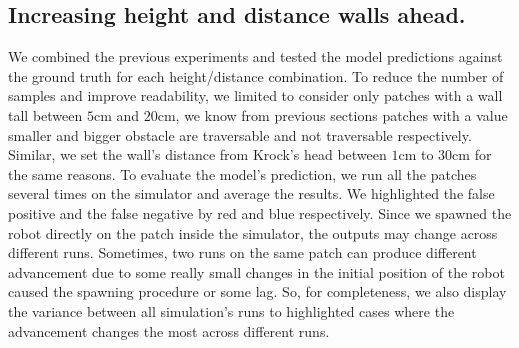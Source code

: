 \documentclass[../document.tex]{subfiles}
\begin{document}
\subsection{Increasing height and distance walls ahead.}
We combined the previous experiments and tested the model predictions against the ground truth for each height/distance combination. To reduce the number of samples and improve readability, we limited to consider only patches with a wall tall between $5$cm and $20$cm, we know from previous sections patches with a value smaller and bigger obstacle are traversable and not traversable respectively. Similar, we set the wall's distance from Krock's head between $1$cm to $30$cm for the same reasons. To evaluate the model's prediction, we run all the patches several times on the simulator and average the results. We highlighted the false positive and the false negative by red and blue respectively. Since we spawned the robot directly on the patch inside the simulator, the outputs may change across different runs. Sometimes, two runs on the same patch can produce different advancement due to some really small changes in the initial position of the robot caused the spawning procedure or some lag. So, for completeness, we also display the variance between all simulation's runs to highlighted cases where the advancement changes the most across different runs. 
\end{document}
